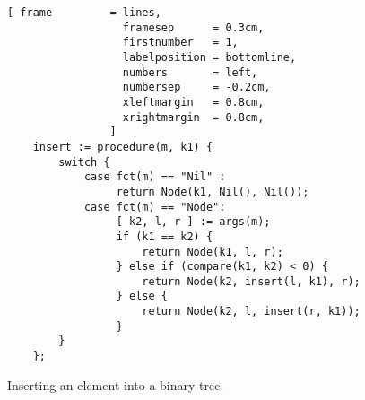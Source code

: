 \begin{figure}[!ht]
\centering
\begin{Verbatim}[ frame         = lines, 
                  framesep      = 0.3cm, 
                  firstnumber   = 1,
                  labelposition = bottomline,
                  numbers       = left,
                  numbersep     = -0.2cm,
                  xleftmargin   = 0.8cm,
                  xrightmargin  = 0.8cm,
                ]
    insert := procedure(m, k1) {
        switch {
            case fct(m) == "Nil" : 
                 return Node(k1, Nil(), Nil());
            case fct(m) == "Node": 
                 [ k2, l, r ] := args(m);
                 if (k1 == k2) {
                     return Node(k1, l, r);
                 } else if (compare(k1, k2) < 0) { 
                     return Node(k2, insert(l, k1), r);
                 } else {
                     return Node(k2, l, insert(r, k1));
                 }
        }
    };
\end{Verbatim}
\vspace*{-0.3cm}
\caption{Inserting an element into a binary tree.}
\label{fig:binary-tree-no-matching.stlx}
\end{figure}

